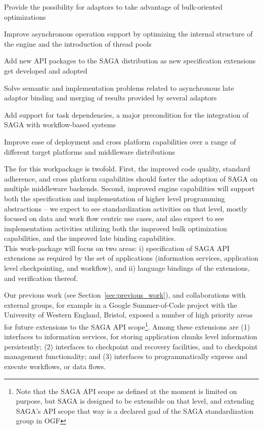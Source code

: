 \documentclass[10pt,letterpaper]{article}
\begin{document}
\begin{shortlist}
	\item Provide the possibility for adaptors to take advantage of bulk-oriented
	      optimizations
	\item Improve asynchronous operation support by optimizing the internal
	      structure of the engine and the introduction of thread pools 
	\item Add new API packages to the SAGA distribution as new specification
	      extensions get developed and adopted
	\item Solve semantic and implementation problems related to asynchronous
	      late adaptor binding and merging of results provided by several adaptors
	\item Add support for task dependencies, a major precondition for the integration
	      of SAGA with workflow-based systems
	\item Improve ease of deployment and cross platform capabilities over a
	      range of different target platforms and middleware distributions
\end{shortlist}

The  for this workpackage is twofold.  First, the
improved code quality, standard adherence, and cross platform
capabilities should foster the adoption of SAGA on multiple middleware
backends.  Second, improved engine capabilities will support both the
specification and implementation of higher level programming
abstractions -- we expect to see standardization activities on that
level, mostly focused on data and work flow centric use cases, and
also expect to see implementation activities utilizing both the
improved bulk optimization capabilities, and the improved late binding
capabilities.\\[-0.5em]


This work-package will focus on two areas: i) specification of
SAGA API extensions as required by the set of applications
(information services, application level checkpointing, and
workflow), and ii) language bindings of the extensions, and
verification thereof.

  Our previous work (see
Section~\ref{sec:previous_work}), and collaborations with
external groups, for example in a Google Summer-of-Code project
with the University of Western England, Bristol, exposed
a number of high priority areas for future extensions to the
SAGA API scope\footnote{Note that the SAGA API scope as defined
at the moment is limited on purpose, but SAGA is designed to be
extensible on that level, and extending SAGA's API scope that
way is a declared goal of the SAGA standardization group in
OGF}.  Among these extensions are (1) interfaces to information
services, for storing application chunks level information
persistently; (2) interfaces to checkpoint and recovery
facilities, and to checkpoint management functionality; and (3)
interfaces to programmatically express and execute workflows, or
data flows.
\end{document}

